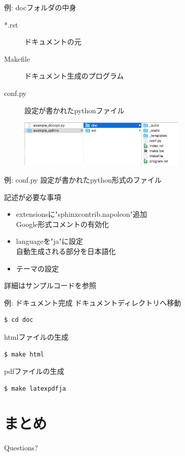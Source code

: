 \documentclass[12pt, xetex, xcolor=pdftex, dvipsnames]{beamer}
\begin{document}
\begin{frame}{例: docフォルダの中身}
    \begin{description}
        \item[*.rst] ドキュメントの元
        \item[Makefile] ドキュメント生成のプログラム
        \item[conf.py] 設定が書かれたpythonファイル
    \end{description}
    \begin{figure}
        \centering
        \includegraphics[width=8cm]{img/sphinx.png}
    \end{figure}
\end{frame}
\begin{frame}{例: conf.py}
    設定が書かれたpython形式のファイル

    \begin{block}{記述が必要な事項}
        \begin{itemize}
            \item extensionsに"sphinxcontrib.napoleon"追加\\
                Google形式コメントの有効化
            \item languageを"ja"に設定\\
                自動生成される部分を日本語化
            \item テーマの設定
        \end{itemize}
        詳細はサンプルコードを参照
    \end{block}
\end{frame}
\begin{frame}[fragile]{例: ドキュメント完成}
    ドキュメントディレクトリへ移動
    \begin{lstlisting}[language=Bash]
$ cd doc
    \end{lstlisting}

    htmlファイルの生成
    \begin{lstlisting}[language=Bash]
$ make html
    \end{lstlisting}

    pdfファイルの生成
    \begin{lstlisting}[language=Bash]
$ make latexpdfja
    \end{lstlisting}
\end{frame}
\section{まとめ}
\begin{frame}[standout]
  Questions?
\end{frame}
\end{document}
